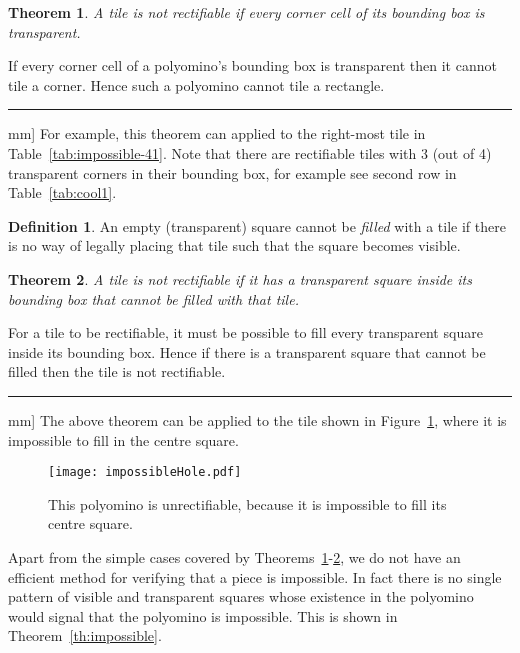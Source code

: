 \documentclass[10pt,a4paper]{article}
\newcommand{\BlackBox}{\rule{1.5ex}{1.5ex}}  \fi
\newenvironment{proof}{\par\noindent{\bf Proof\ }}{\hfill\BlackBox\2mm]}
\newtheorem{theorem}{Theorem}
\theoremstyle{definition}
\newtheorem{defn}{Definition}[section]
\begin{document}
\begin{theorem}
A tile is not rectifiable if every corner cell of its bounding box is transparent.
\label{th:impossible2}
\end{theorem}
\begin{proof}
If every corner cell of a polyomino's bounding box is transparent then 
it cannot tile a corner. Hence such a polyomino cannot tile a rectangle.
\end{proof}
For example, this theorem can applied to the right-most tile in Table~\ref{tab:impossible-41}.
Note that there are rectifiable tiles with 3 (out of 4) transparent corners in their bounding box,
for example see second row in Table~\ref{tab:cool1}.

\begin{defn}
An empty (transparent) square cannot be \emph{filled} with a tile if there is no way of legally placing that tile such that
the square becomes visible.
\end{defn}
\begin{theorem}
A tile is not rectifiable if it has a transparent square inside its bounding box that cannot be filled with that tile.
\label{th:impossibleHole}
\end{theorem}
\begin{proof}
For a tile to be rectifiable, it must be possible to fill every transparent square inside its bounding box.
Hence if there is a transparent square that cannot be filled then the tile is not rectifiable.
\end{proof}
The above theorem can be applied to the tile shown in Figure~\ref{fig:impossibleHole}, where it is impossible to fill in the centre square.

\begin{figure}[!htpb]
\centering
\texttt{[image: impossibleHole.pdf]}
\caption{This polyomino is unrectifiable, because it is impossible to fill its centre square.}
\label{fig:impossibleHole}
\end{figure}


Apart from the simple cases covered by Theorems~\ref{th:impossible2}-\ref{th:impossibleHole},
we do not have an efficient method for verifying that a piece is impossible.
In fact
there is no single pattern of visible and transparent squares whose existence in the polyomino would
signal that the polyomino is impossible. This is shown in Theorem~\ref{th:impossible}.
\end{document}
